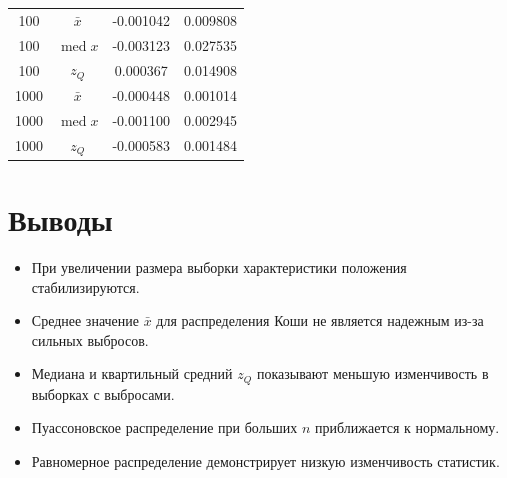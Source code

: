\documentclass[a4paper]{article}
\begin{document}
\begin{table}[!htbp]
{\begin{tabular}{|c|c|c|c|}
            100              & $\bar{x}$               & -0.001042     & 0.009808      \\
            100              & $\operatorname{med} x$  & -0.003123     & 0.027535      \\
            100              & $z_Q$                   & 0.000367      & 0.014908      \\            \hline

            1000             & $\bar{x}$               & -0.000448     & 0.001014      \\
            1000             & $\operatorname{med} x$  & -0.001100     & 0.002945      \\
            1000             & $z_Q$                   & -0.000583     & 0.001484      \\
            \hline
        \end{tabular}
}
        \label{tab:table}
    \end{table}


    \section{Выводы}\label{sec:}
    \begin{itemize}
        \item При увеличении размера выборки характеристики положения стабилизируются.
        \item Среднее значение $\bar{x}$ для распределения Коши не является надежным из-за сильных выбросов.
        \item Медиана и квартильный средний $z_Q$ показывают меньшую изменчивость в выборках с выбросами.
        \item Пуассоновское распределение при больших $n$ приближается к нормальному.
        \item Равномерное распределение демонстрирует низкую изменчивость статистик.
    \end{itemize}
\end{document}
